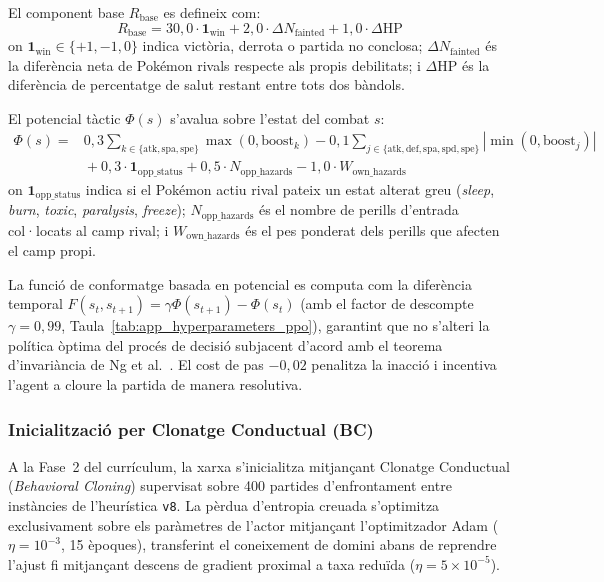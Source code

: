 El component base $R_{\mathrm{base}}$ es defineix com:
\begin{equation}
    R_{\mathrm{base}} = 30{,}0 \cdot \mathbf{1}_{\mathrm{win}} + 2{,}0 \cdot \Delta N_{\mathrm{fainted}} + 1{,}0 \cdot \Delta \mathrm{HP}
\end{equation}
on $\mathbf{1}_{\mathrm{win}} \in \{+1, -1, 0\}$ indica victòria, derrota o partida no conclosa; $\Delta N_{\mathrm{fainted}}$ és la diferència neta de Pokémon rivals respecte als propis debilitats; i $\Delta \mathrm{HP}$ és la diferència de percentatge de salut restant entre tots dos bàndols.

El potencial tàctic $\Phi(s)$ s'avalua sobre l'estat del combat $s$:
\begin{align}
    \Phi(s) ={} & 0{,}3 \sum_{k \in \{\mathrm{atk,spa,spe}\}} \max(0, \text{boost}_k) 
    - 0{,}1 \sum_{j \in \{\mathrm{atk,def,spa,spd,spe}\}} |\min(0, \text{boost}_j)| \nonumber \\
    & {} + 0{,}3 \cdot \mathbf{1}_{\mathrm{opp\_status}} 
    + 0{,}5 \cdot N_{\mathrm{opp\_hazards}} 
    - 1{,}0 \cdot W_{\mathrm{own\_hazards}}
\end{align}
on $\mathbf{1}_{\mathrm{opp\_status}}$ indica si el Pokémon actiu rival pateix un estat alterat greu (\emph{sleep}, \emph{burn}, \emph{toxic}, \emph{paralysis}, \emph{freeze}); $N_{\mathrm{opp\_hazards}}$ és el nombre de perills d'entrada col·locats al camp rival; i $W_{\mathrm{own\_hazards}}$ és el pes ponderat dels perills que afecten el camp propi. 

La funció de conformatge basada en potencial es computa com la diferència temporal $F(s_t, s_{t+1}) = \gamma \Phi(s_{t+1}) - \Phi(s_t)$ (amb el factor de descompte $\gamma = 0{,}99$, Taula~\ref{tab:app_hyperparameters_ppo}), garantint que no s'alteri la política òptima del procés de decisió subjacent d'acord amb el teorema d'invariància de Ng et al.~\cite{ng_reward_shaping}. El cost de pas $-0{,}02$ penalitza la inacció i incentiva l'agent a cloure la partida de manera resolutiva.

\subsubsection{Inicialització per Clonatge Conductual (BC)}

A la Fase~2 del currículum, la xarxa s'inicialitza mitjançant Clonatge Conductual (\emph{Behavioral Cloning}) supervisat sobre 400 partides d'enfrontament entre instàncies de l'heurística \texttt{v8}. La pèrdua d'entropia creuada s'optimitza exclusivament sobre els paràmetres de l'actor mitjançant l'optimitzador Adam ($\eta = 10^{-3}$, 15 èpoques), transferint el coneixement de domini abans de reprendre l'ajust fi mitjançant descens de gradient proximal a taxa reduïda ($\eta = 5 \times 10^{-5}$).



